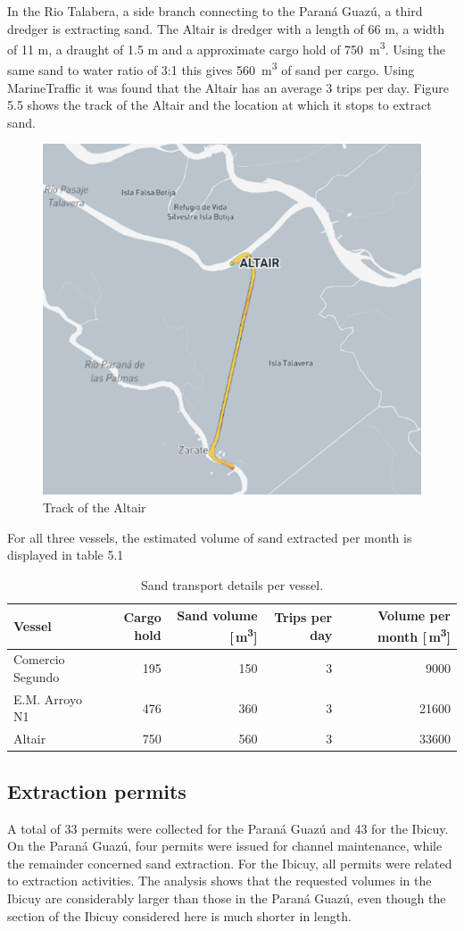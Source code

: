 In the Rio Talabera, a side branch connecting to the Paraná Guazú, a third dredger is extracting sand. The Altair is dredger with a length of 66 m, a width of 11 m, a draught of 1.5 m and a approximate cargo hold of 750 \,m\textsuperscript{3}. Using the same sand to water ratio of 3:1 this gives 560 \,m\textsuperscript{3} of sand per cargo. Using MarineTraffic it was found that the Altair has an average 3 trips per day. Figure 5.5 shows the track of the Altair and the location at which it stops to extract sand. 

\begin{figure}[H]
    \centering
    \includegraphics[width=0.5\linewidth]{figures/ch5/Track_Altair.png}
    \caption{Track of the Altair}
    \label{fig:placeholder}
\end{figure}

For all three vessels, the estimated volume of sand extracted per month is displayed in table 5.1
\begin{table}[h!]
\centering
\begin{tabular}{lrrrr}
\hline
\textbf{Vessel} & \textbf{Cargo hold} & \textbf{Sand volume [\,m\textsuperscript{3}]} & \textbf{Trips per day} & \textbf{Volume per month [\,m\textsuperscript{3}]} \\
\hline
Comercio Segundo & 195 & 150 & 3 & 9000 \\
E.M. Arroyo N1 & 476 & 360 & 3 & 21600 \\
Altair & 750 & 560 & 3 & 33600 \\
\hline
\end{tabular}
\caption{Sand transport details per vessel.}
\label{tab:sand_volume}
\end{table}

\subsection{Extraction permits}
A total of 33 permits were collected for the Paraná Guazú and 43 for the Ibicuy. On the Paraná Guazú, four permits were issued for channel maintenance, while the remainder concerned sand extraction. For the Ibicuy, all permits were related to extraction activities. The analysis shows that the requested volumes in the Ibicuy are considerably larger than those in the Paraná Guazú, even though the section of the Ibicuy considered here is much shorter in length.

